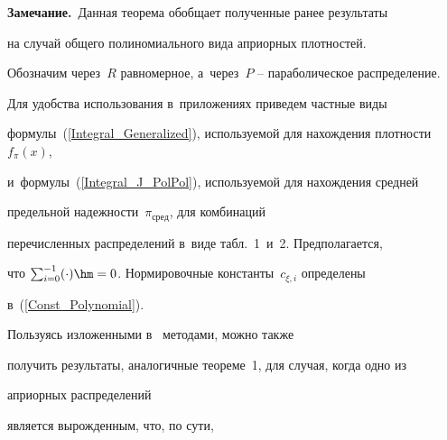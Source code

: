\smallskip





\noindent


\textbf{Замечание.}\ Данная теорема обобщает полученные ранее результаты~\cite{KP2016,KuSoSh} 


на случай общего полиномиального вида априорных плотностей.





\smallskip





Обозначим через~$R$ равномерное, а~через~$P$ -- параболическое распределение.


Для удобства использования в~приложениях приведем частные виды 


формулы~(\ref{Integral_Generalized}), используемой для нахождения плотности~$f_\pi(x)$, 


и~формулы~(\ref{Integral_J_PolPol}), используемой для нахождения средней 


предельной надежности~$\pi_{\mathrm{сред}}$, для комбинаций 


пе\-ре\-чис\-лен\-ных распределений в~виде табл.~1~и~2. Предполагается, 


что $\sum_{i=0}^{-1}(\cdot)\hm=0$. Нормировочные константы~$c_{\xi,i}$ определены 


в~(\ref{Const_Polynomial}).




















Пользуясь изложенными в~\cite{KP2016} методами, можно также 


получить результаты, аналогичные теореме~1, для случая, когда одно из 


априорных распределений\linebreak\vspace*{-12pt}





\pagebreak





\noindent


 является вырожденным, что, по сути, 


